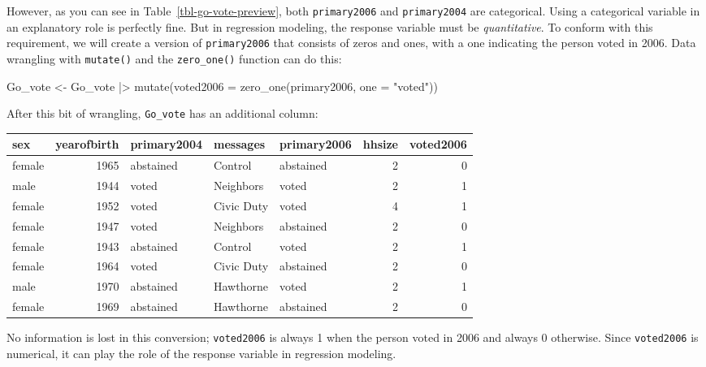 \documentclass[
  letterpaper,
  DIV=11,
  numbers=noendperiod,
  oneside]{scrartcl}
\newenvironment{Shaded}{\begin{snugshade}}{\end{snugshade}}
\newcommand{\AttributeTok}[1]{\textcolor[rgb]{0.40,0.45,0.13}{#1}}
\newcommand{\FunctionTok}[1]{\textcolor[rgb]{0.28,0.35,0.67}{#1}}
\newcommand{\NormalTok}[1]{\textcolor[rgb]{0.00,0.23,0.31}{#1}}
\newcommand{\OtherTok}[1]{\textcolor[rgb]{0.00,0.23,0.31}{#1}}
\newcommand{\SpecialCharTok}[1]{\textcolor[rgb]{0.37,0.37,0.37}{#1}}
\newcommand{\StringTok}[1]{\textcolor[rgb]{0.13,0.47,0.30}{#1}}
\begin{document}
However, as you can see in Table~\ref{tbl-go-vote-preview}, both
\texttt{primary2006} and \texttt{primary2004} are categorical. Using a
categorical variable in an explanatory role is perfectly fine. But in
regression modeling, the response variable must be \emph{quantitative}.
To conform with this requirement, we will create a version of
\texttt{primary2006} that consists of zeros and ones, with a one
indicating the person voted in 2006. Data wrangling with
\texttt{mutate()} and the \texttt{zero\_one()} function can do this:

\begin{Shaded}
\begin{Highlighting}[]
\NormalTok{Go\_vote }\OtherTok{\textless{}{-}}\NormalTok{ Go\_vote }\SpecialCharTok{|\textgreater{}} 
  \FunctionTok{mutate}\NormalTok{(}\AttributeTok{voted2006 =} \FunctionTok{zero\_one}\NormalTok{(primary2006, }\AttributeTok{one =} \StringTok{"voted"}\NormalTok{))}
\end{Highlighting}
\end{Shaded}

After this bit of wrangling, \texttt{Go\_vote} has an additional column:

\begin{tabular}{l|r|l|l|l|r|r}
\hline
sex & yearofbirth & primary2004 & messages & primary2006 & hhsize & voted2006\\
\hline
female & 1965 & abstained & Control & abstained & 2 & 0\\
\hline
male & 1944 & voted & Neighbors & voted & 2 & 1\\
\hline
female & 1952 & voted & Civic Duty & voted & 4 & 1\\
\hline
female & 1947 & voted & Neighbors & abstained & 2 & 0\\
\hline
female & 1943 & abstained & Control & voted & 2 & 1\\
\hline
female & 1964 & voted & Civic Duty & abstained & 2 & 0\\
\hline
male & 1970 & abstained & Hawthorne & voted & 2 & 1\\
\hline
female & 1969 & abstained & Hawthorne & abstained & 2 & 0\\
\hline
\end{tabular}

No information is lost in this conversion; \texttt{voted2006} is always
1 when the person voted in 2006 and always 0 otherwise. Since
\texttt{voted2006} is numerical, it can play the role of the response
variable in regression modeling.
\end{document}
